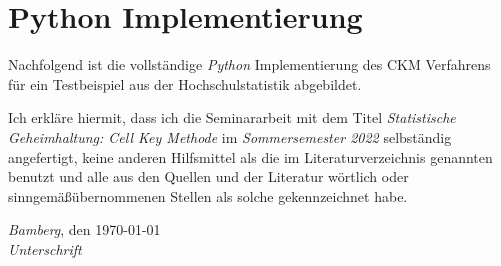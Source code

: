 %

\newpage 
\appendix
\section{Python Implementierung}

Nachfolgend ist die vollständige \textit{Python} Implementierung des CKM Verfahrens für ein Testbeispiel aus der Hochschulstatistik abgebildet.





\newpage 
\noindent%
Ich erkläre hiermit, dass ich die Seminararbeit mit dem Titel \emph{Statistische Geheimhaltung: Cell Key Methode} im \emph{Sommersemester 2022} selbständig angefertigt, keine anderen Hilfsmittel als die im Literaturverzeichnis genannten benutzt und alle aus den Quellen und der Literatur wörtlich oder sinngemä\ss übernommenen Stellen als solche gekennzeichnet habe.%
\bigskip
 
\noindent%
\emph{Bamberg}, den \today\\%
\emph{Unterschrift}%

%

